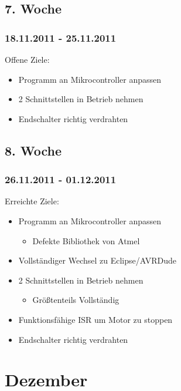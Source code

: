 \documentclass[ngerman]{beamer}
\begin{document}
\subsection{7. Woche}
\begin{frame}\frametitle{18.11.2011 - 25.11.2011}
Offene Ziele: 
\begin{itemize}
\item Programm an Mikrocontroller anpassen 
\item 2 Schnittstellen in Betrieb nehmen 
\item Endschalter richtig verdrahten
\end{itemize}
\end{frame}
\subsection{8. Woche}
\begin{frame}\frametitle{26.11.2011 - 01.12.2011}
Erreichte Ziele: 
\begin{itemize}
\item Programm an Mikrocontroller anpassen 
\begin{itemize}
\item Defekte Bibliothek von Atmel 
\end{itemize}
\item Vollständiger Wechsel zu Eclipse/AVRDude 
\item 2 Schnittstellen in Betrieb nehmen 
\begin{itemize}
\item Größtenteils Vollständig 
\end{itemize}
\item Funktionsfähige ISR um Motor zu stoppen 
\item Endschalter richtig verdrahten
\end{itemize}
\end{frame}
\section{Dezember}
\end{document}
